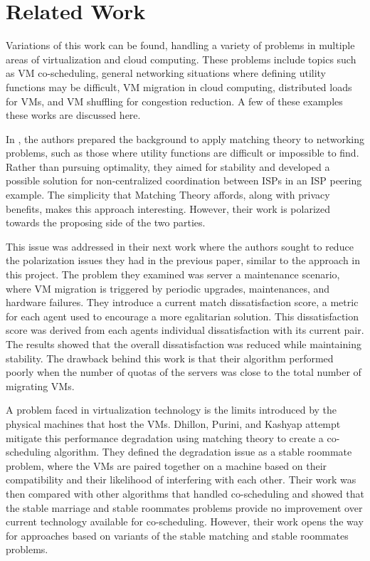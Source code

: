 \documentclass[conference]{IEEEtran}
\begin{document}
\section{Related Work}
\label{sec:related}
Variations of this work can be found, 
handling a variety of problems in multiple areas of virtualization and cloud computing.  
These problems include topics such as VM co-scheduling, general networking situations where defining utility functions may be difficult, 
VM migration in cloud computing, distributed loads for VMs, and VM shuffling for congestion reduction.  
A few of these examples these works are discussed here.
\cite{jiang_analysis_2008}
\cite{adolphs_distributed_2012}

In \cite{xu_seen_2011}, the authors prepared the background to apply matching theory to networking problems, such as those where utility functions are difficult or impossible to find.
Rather than pursuing optimality, they aimed for stability and developed a possible solution for non-centralized coordination between ISPs in an ISP peering example.  The simplicity that Matching Theory affords, along with privacy benefits, makes this approach interesting.  However, their work is polarized towards the proposing side of the two parties.  

This issue was addressed in their next work \cite{xu_egalitarian_2011} where the authors sought to reduce the polarization issues they had in the previous paper, similar to the approach in this project.  
The problem they examined was server a maintenance scenario, where VM migration is triggered by periodic upgrades, maintenances, and hardware failures.  
They introduce a current match dissatisfaction score, a metric for each agent used to encourage a more egalitarian solution.  
This dissatisfaction score was derived from each agents individual dissatisfaction with its current pair.  
The results showed that the overall dissatisfaction was reduced while maintaining stability.  
The drawback behind this work is that their algorithm performed poorly when the number of quotas of the servers was close to the total number of migrating VMs.

A problem faced in virtualization technology is the limits introduced by the physical machines that host the VMs.  
Dhillon, Purini, and Kashyap \cite{dhillon_virtual_2013} attempt mitigate this performance degradation using matching theory to create a co-scheduling algorithm.  
They defined the degradation issue as a stable roommate problem, 
where the VMs are paired together on a machine based on their compatibility and their likelihood of interfering with each other.  
Their work was then compared with other algorithms that handled co-scheduling and showed that the stable marriage and stable roommates problems provide no improvement over current technology available for co-scheduling.  
However, their work opens the way for approaches based on variants of the stable matching and stable roommates problems.
\end{document}
